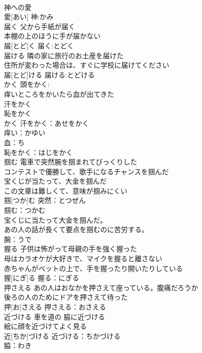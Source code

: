 \documentclass[8pt]{extreport}
\begin{document}
\begin{CJK}{UTF8}{min}
\\	神への愛 
\\	愛[あい]			神:かみ
\\	届く	父から手紙が届く 
\\	本棚の上のほうに手が届かない 
\\	届[とど]く			届く:とどく
\\	届ける	隣の家に旅行のお土産を届けた 
\\	住所が変わった場合は、すぐに学校に届けてください 
\\	届[とど]ける			届ける:とどける
\\	かく	頭をかく: 
\\	痒いところをかいたら血が出てきた 
\\	汗をかく 
\\	恥をかく 
\\	かく			汗をかく：あせをかく
\\	痒い：かゆい
\\	血：ち
\\	恥をかく：はじをかく
\\	掴む	電車で突然腕を掴まれてびっくりした 
\\	コンテストで優勝して、歌手になるチャンスを掴んだ 
\\	宝くじが当たって、大金を掴んだ 
\\	この文章は難しくて、意味が掴みにくい 
\\	掴[つか]む				突然：とつぜん
\\	掴む：つかむ
\\	宝くじに当たって大金を掴んだ。 
\\	あの人の話が長くて要点を掴むのに苦労する。 
\\	腕：うで
\\	握る	子供は怖がって母親の手を強く握った 
\\	母はカラオケが大好きで、マイクを握ると離さない 
\\	赤ちゃんがベットの上で、手を握ったり開いたりしている 
\\	握[にぎ]る			握る：にぎる
\\	押さえる	あの人はおなかを押さえて座っている。腹痛だろうか 
\\	後ろの人のためにドアを押さえて待った 
\\	押[お]さえる			押さえる：おさえる
\\	近づける	車を道の 脇に近づける 
\\	絵に顔を近づけてよく見る 
\\	近[ちか]づける			近づける：ちかづける
\\	脇：わき

\end{CJK}
\end{document}
